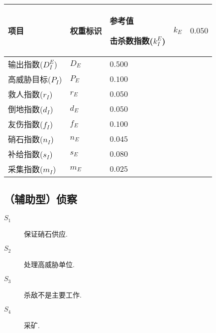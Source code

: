 \documentclass{ctexart}
\begin{document}
\begin{longtable}{|>{\centering\arraybackslash}p{8em}|>{\centering\arraybackslash}p{4em}|>{\centering\arraybackslash}p{6em}|}
    \hline

    项目             & 权重标识  & 参考值     \endhead

    \hline

    击杀数指数($k_I^E$) & $k_E$ & $0.050$          \\

    \hline

    输出指数($D_I^E$)  & $D_E$ & $0.500$          \\

    \hline

    高威胁目标($P_I$)   & $P_E$ & $0.100$          \\

    \hline

    救人指数($r_I$)    & $r_E$ & $0.050$          \\

    \hline

    倒地指数($d_I$)    & $d_E$ & $0.050$          \\

    \hline

    友伤指数($f_I$)    & $f_E$ & $0.100$          \\

    \hline

    硝石指数($n_I$)    & $n_E$ & $0.045$          \\

    \hline

    补给指数($s_I$)    & $s_E$ & $0.080$          \\

    \hline

    采集指数($m_I$)    & $m_E$ & $0.025$          \\

    \hline
\end{longtable}


\subsection{（辅助型）侦察}

\begin{description}
    \item[$S_1$] 保证硝石供应.\cite{bilibili-scout}\cite{tieba-scout}\cite{tieba-all}\cite{xiaoheihe-all}
    \item[$S_2$] 处理高威胁单位.\cite{bilibili-scout}\cite{tieba-scout}\cite{tieba-all}
    \item[$S_3$] 杀敌不是主要工作.\cite{tieba-scout}\cite{tieba-all}\cite{xiaoheihe-all}
    \item[$S_4$] 采矿.\cite{tieba-all}\cite{xiaoheihe-all}
\end{description}
\end{document}
